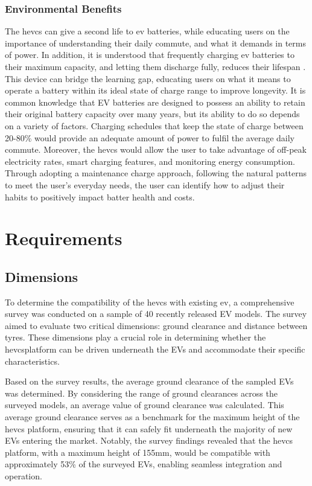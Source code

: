 \documentclass [12pt]{article}
\begin{document}
\subsubsection{Environmental Benefits}
The \gls{hevcs} can give a second life to \gls{ev} batteries, while educating users on the importance of understanding their daily commute, and what it demands in terms of power. In addition, it is understood that frequently charging \gls{ev} batteries to their maximum capacity, and letting them discharge fully, reduces their lifespan \cite{haram2021feasibility}. This device can bridge the learning gap, educating users on what it means to operate a battery within its ideal state of charge range to improve longevity.
It is common knowledge that EV batteries are designed to possess an ability to retain their original battery capacity over many years, but its ability to do so depends on a variety of factors. Charging schedules that keep the state of charge between 20-80\% would provide an adequate amount of power to fulfil the average daily commute. Moreover, the \gls{hevcs} would allow the user to take advantage of off-peak electricity rates, smart charging features, and monitoring energy consumption. Through adopting a maintenance charge approach, following the natural patterns to meet the user’s everyday needs, the user can identify how to adjust their habits to positively impact batter health and costs.


\newpage
\section{Requirements}\label{sec:req}

\subsection{Dimensions}

To determine the compatibility of the \gls{hevcs} with existing \gls{ev}, a comprehensive survey was conducted on a sample of 40 recently released EV models. The survey aimed to evaluate two critical dimensions: ground clearance and distance between tyres. These dimensions play a crucial role in determining whether the \gls{hevcs}platform can be driven underneath the EVs and accommodate their specific characteristics.

Based on the survey results, the average ground clearance of the sampled EVs was determined. By considering the range of ground clearances across the surveyed models, an average value of ground clearance was calculated. This average ground clearance serves as a benchmark for the maximum height of the \gls{hevcs} platform, ensuring that it can safely fit underneath the majority of new EVs entering the market. Notably, the survey findings revealed that the \gls{hevcs} platform, with a maximum height of 155mm, would be compatible with approximately 53\% of the surveyed EVs, enabling seamless integration and operation.
\end{document}
